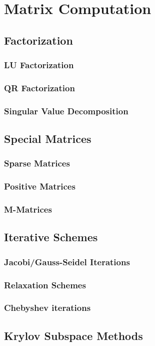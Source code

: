 \chapter{Matrix Computation}
\label{Ch: 8-Mat-Com}
\section{Factorization}
\subsection{LU Factorization}
\subsection{QR Factorization}
\subsection{Singular Value Decomposition}
\section{Special Matrices}
\subsection{Sparse Matrices}
\subsection{Positive Matrices}
\subsection{M-Matrices}
\section{Iterative Schemes}
\subsection{Jacobi/Gauss-Seidel Iterations}
\subsection{Relaxation Schemes}
\subsection{Chebyshev iterations}
\newpage
\section{Krylov Subspace Methods}
